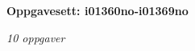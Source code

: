 \centerline{\bf Oppgavesett: i01360no-i01369no}
\vskip 10pt
\centerline{\it 10 oppgaver}\vskip 10pt
\vskip 10pt
